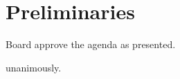 \section*{Preliminaries}

\begin{information}
\end{information}

\begin{motion}
    \birt Board approve the agenda as presented.
    \movers{\elizebeth}{\andrewc}

    \carries unanimously.
\end{motion}
